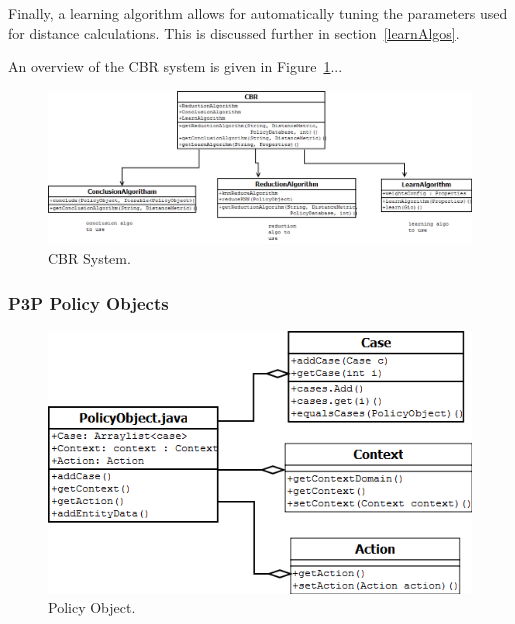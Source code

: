 Finally, a learning algorithm allows for automatically tuning the parameters used for distance calculations. This is discussed further in section~\ref{learnAlgos}.

An overview of the CBR system is given in Figure~\ref{cbr_fig}...


\begin{figure}[htbp]
\begin{center}
\includegraphics[width = \textwidth]{DesignReport/uml/CBR.png}
\caption{CBR System.}
\label{cbr_fig}
\end{center}
\end{figure}


\subsubsection{P3P Policy Objects}

\begin{figure}[htbp]
\begin{center}
\includegraphics[width = \textwidth]{DesignReport/uml/po.png}
\caption{Policy Object.}
\label{po_fig}
\end{center}
\end{figure}

